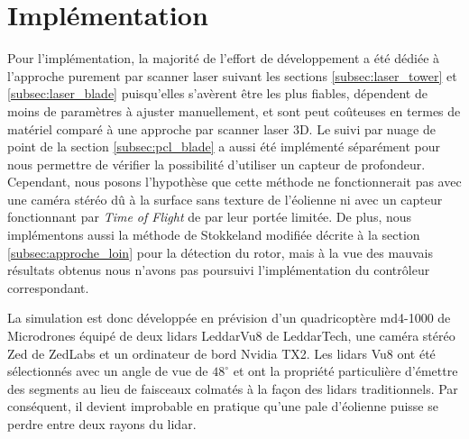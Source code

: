 %

\clearpage
\section{Implémentation}

Pour l'implémentation, la majorité de l'effort de développement a été dédiée à l'approche purement par scanner laser suivant les sections \ref{subsec:laser_tower} et \ref{subsec:laser_blade} puisqu'elles s'avèrent être les plus fiables, dépendent de moins de paramètres à ajuster manuellement, et sont peut coûteuses en termes de matériel comparé à une approche par scanner laser 3D. Le suivi par nuage de point de la section \ref{subsec:pcl_blade} a aussi été implémenté séparément pour nous permettre de vérifier la possibilité d'utiliser un capteur de profondeur. Cependant, nous posons l'hypothèse que cette méthode ne fonctionnerait pas avec une caméra stéréo dû à la surface sans texture de l'éolienne ni avec un capteur fonctionnant par \textit{Time of Flight} de par leur portée limitée.
De plus, nous implémentons aussi la méthode de Stokkeland modifiée décrite à la section \ref{subsec:approche_loin} pour la détection du rotor, mais à la vue des mauvais résultats obtenus nous n'avons pas poursuivi l'implémentation du contrôleur correspondant.

La simulation est donc développée en prévision d'un quadricoptère md4-1000 de Microdrones équipé de deux lidars LeddarVu8 de LeddarTech, une caméra stéréo Zed de ZedLabs et un ordinateur de bord Nvidia TX2. Les lidars Vu8 ont été sélectionnés avec un angle de vue de $48^{\circ}$ et ont la propriété particulière d'émettre des segments au lieu de faisceaux colmatés à la façon des lidars traditionnels. Par conséquent, il devient improbable en pratique qu'une pale d'éolienne puisse se perdre entre deux rayons du lidar.

